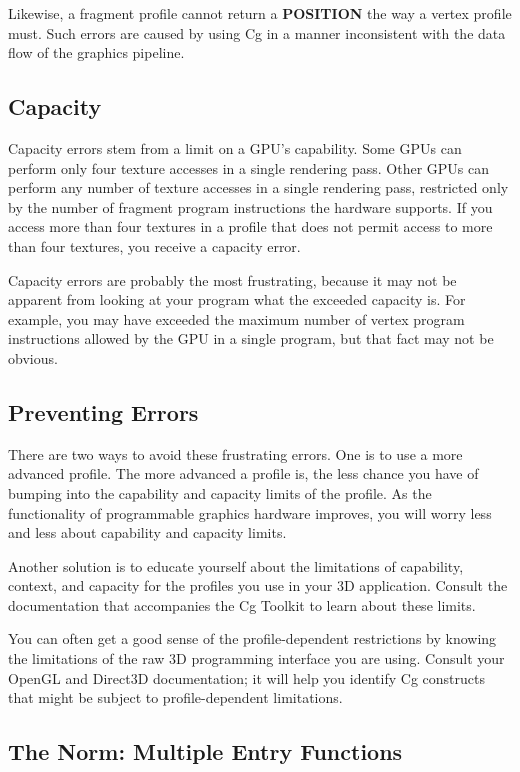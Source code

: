\documentclass[../main.tex]{subfiles}
\begin{document}
Likewise, a fragment profile cannot return a \textbf{POSITION} the way a vertex profile must. Such errors are caused by using Cg in a manner inconsistent with the data flow of the graphics pipeline.

\subsection*{Capacity}

Capacity errors stem from a limit on a GPU's capability. Some GPUs can perform only four texture accesses in a single rendering pass. Other GPUs can perform any number of texture accesses in a single rendering pass, restricted only by the number of fragment program instructions the hardware supports. If you access more than four textures in a profile that does not permit access to more than four textures, you receive a capacity error.

Capacity errors are probably the most frustrating, because it may not be apparent from looking at your program what the exceeded capacity is. For example, you may have exceeded the maximum number of vertex program instructions allowed by the GPU in a single program, but that fact may not be obvious.

\subsection*{Preventing Errors}

There are two ways to avoid these frustrating errors. One is to use a more advanced profile. The more advanced a profile is, the less chance you have of bumping into the capability and capacity limits of the profile. As the functionality of programmable graphics hardware improves, you will worry less and less about capability and capacity limits.

Another solution is to educate yourself about the limitations of capability, context, and capacity for the profiles you use in your 3D application. Consult the documentation that accompanies the Cg Toolkit to learn about these limits.

You can often get a good sense of the profile-dependent restrictions by knowing the limitations of the raw 3D programming interface you are using. Consult your OpenGL and Direct3D documentation; it will help you identify Cg constructs that might be subject to profile-dependent limitations.

\subsection{The Norm: Multiple Entry Functions}
\end{document}
